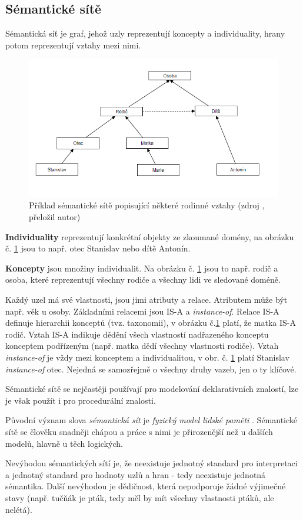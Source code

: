 \subsection{Sémantické sítě}
Sémantická síť je graf, jehož uzly reprezentují koncepty a individuality, hrany potom reprezentují vztahy mezi nimi.\cite{cite:10}\par
\begin{figure}[htbp!]
	\includegraphics[width=0.8\linewidth]{img/semantic_network.png}
	\caption{Příklad sémantické sítě popisující některé rodinné vztahy (zdroj \cite{Stephan2007}, přeložil autor)}
	\label{fig:semantic_network}
\end{figure}
\noindent \textbf{Individuality} reprezentují konkrétní objekty ze zkoumané domény, na obrázku č. \ref{fig:semantic_network} jsou to např. otec Stanislav nebo dítě Antonín.\par
\noindent \textbf{Koncepty} jsou množiny individualit. Na obrázku č. \ref{fig:semantic_network} jsou to např. rodič a osoba, které reprezentují všechny rodiče a všechny lidi ve sledované doméně.\cite{cite:10}\par
\par Každý uzel má své vlastnosti, jsou jimi atributy a relace. Atributem může být např. věk u osoby. Základními relacemi jsou IS-A a \textit{instance-of}. Relace IS-A definuje hierarchii konceptů (tvz. taxonomii), v obrázku č.\ref{fig:semantic_network} platí, že matka IS-A rodič. Vztah IS-A indikuje dědění všech vlastností nadřazeného konceptu konceptem podřízeným (např. matka dědí všechny vlastnosti rodiče). Vztah \textit{instance-of} je vždy mezi konceptem a individualitou, v obr. č. \ref{fig:semantic_network} platí Stanislav \textit{instance-of} otec.\cite{cite:10} Nejedná se samozřejmě o všechny druhy vazeb, jen o ty klíčové.\par
Sémantické sítě se nejčastěji používají pro modelování deklarativních znalostí, lze je však použít i pro procedurální znalosti.\cite{cite:11}\par
Původní význam slova \textit{sémantická sít} je \textit{fyzický model lidské paměti} \cite{cite:12}. Sémantické sítě se člověku snadněji chápou a práce s nimi je přirozenější než u dalších modelů, hlavně u těch logických.\par
Nevýhodou sémantických sítí je, že neexistuje jednotný standard pro interpretaci a jednotný standard pro hodnoty uzlů a hran - tedy neexistuje jednotná sémantika. Další nevýhodou je dědičnost, která nepodporuje žádné výjimečné stavy (např. tučňák je pták, tedy měl by mít všechny vlastnosti ptáků, ale nelétá). \cite{cite:12}
